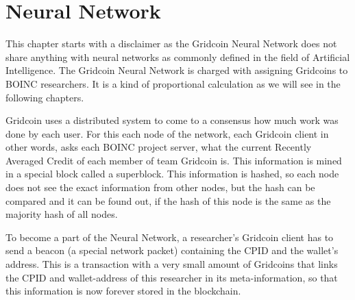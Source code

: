 \section{Neural Network}

This chapter starts with a disclaimer as the Gridcoin Neural Network does not share anything with neural networks as commonly defined in the field of Artificial Intelligence. The Gridcoin Neural Network is charged with assigning Gridcoins to BOINC researchers. It is a kind of proportional calculation as we will see in the following chapters.

Gridcoin uses a distributed system to come to a consensus how much work was done by each user. For this each node of the network, each Gridcoin client in other words, asks each BOINC project server, what the current Recently Averaged Credit of each member of team Gridcoin is. This information is mined in a special block called a superblock. This information is hashed, so each node does not see the exact information from other nodes, but the hash can be compared and it can be found out, if the hash of this node is the same as the majority hash of all nodes.

To become a part of the Neural Network, a researcher's Gridcoin client has to send a beacon (a special network packet) containing the CPID and the wallet's address. This is a transaction with a very small amount of Gridcoins that links  the CPID  and wallet-address of this researcher in its meta-information, so that this information is now forever stored in the blockchain.

